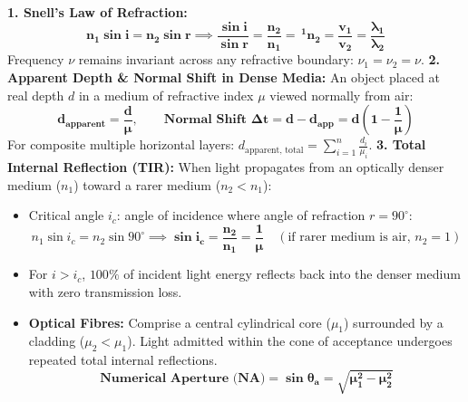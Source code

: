 \documentclass[10pt,a4paper]{article}
\begin{document}
\begin{formulabox}
\textbf{1. Snell's Law of Refraction:}
\begin{equation}
  \mathbf{n_1 \sin i = n_2 \sin r \implies \frac{\sin i}{\sin r} = \frac{n_2}{n_1} = \,^1n_2 = \frac{v_1}{v_2} = \frac{\lambda_1}{\lambda_2}}
\end{equation}
Frequency $\nu$ remains invariant across any refractive boundary: $\nu_1 = \nu_2 = \nu$.
\textbf{2. Apparent Depth \& Normal Shift in Dense Media:}
An object placed at real depth $d$ in a medium of refractive index $\mu$ viewed normally from air:
\begin{equation}
  \mathbf{d_{\text{apparent}} = \frac{d}{\mu}}, \qquad \mathbf{\text{Normal Shift } \Delta t = d - d_{\text{app}} = d\left(1 - \frac{1}{\mu}\right)}
\end{equation}
For composite multiple horizontal layers: $d_{\text{apparent, total}} = \sum_{i=1}^n \frac{d_i}{\mu_i}$.
\textbf{3. Total Internal Reflection (TIR):}
When light propagates from an optically denser medium ($n_1$) toward a rarer medium ($n_2 < n_1$):
\begin{itemize}
  \item Critical angle $i_c$: angle of incidence where angle of refraction $r = 90^\circ$:
  \begin{equation}
    n_1 \sin i_c = n_2 \sin 90^\circ \implies \mathbf{\sin i_c = \frac{n_2}{n_1} = \frac{1}{\mu}} \quad (\text{if rarer medium is air, } n_2 = 1)
  \end{equation}
  \item For $i > i_c$, $100\%$ of incident light energy reflects back into the denser medium with zero transmission loss.
  \item \textbf{Optical Fibres:} Comprise a central cylindrical core ($\mu_1$) surrounded by a cladding ($\mu_2 < \mu_1$). Light admitted within the cone of acceptance undergoes repeated total internal reflections.
  \begin{equation}
    \mathbf{\text{Numerical Aperture (NA)} = \sin\theta_a = \sqrt{\mu_1^2 - \mu_2^2}}
  \end{equation}
\end{itemize}
\end{formulabox}
\end{document}
